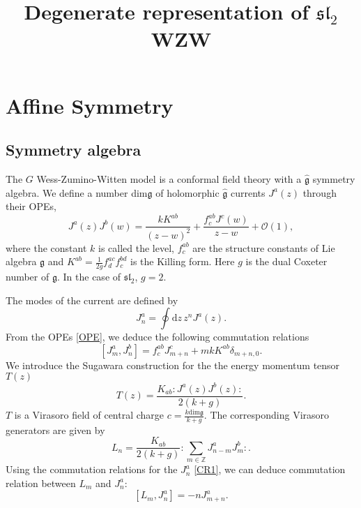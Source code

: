 \documentclass[10pt,a4paper]{article}
\numberwithin{equation}{section}
\begin{document}
\title{Degenerate representation of $\mathfrak{sl}_{2}$ WZW}
\maketitle

\tableofcontents

\section{Affine Symmetry}
\subsection{Symmetry algebra}
The $G$ Wess-Zumino-Witten model is a conformal field theory with a $\hat{\mathfrak{g}}$ symmetry algebra. We define a number dim$\mathfrak{g}$ of 
holomorphic $\hat{\mathfrak{g}}$ currents $J^{a}(z)$ through their OPEs,
\begin{equation}
    \boxed{
        J^{a}(z)J^{b}(w) = \frac{kK^{ab}}{(z-w)^{2}} + \frac{f^{ab}_{c} J^{c}(w)}{z-w} + \mathcal{O}(1), \label{OPE}
        }
\end{equation}
where the constant $k$ is called the level, $f^{ab}_{c}$ are the structure constants of Lie algebra $\mathfrak{g}$ and 
$K^{ab} = \frac{1}{2g} f^{ac}_{d}f^{bd}_{c}$ is the Killing form. Here $g$ is the dual Coxeter number of $\mathfrak{g}$. In the case of 
$\mathfrak{sl}_{2}$, $g = 2$.\\
\par The modes of the current are defined by 
\begin{equation}
    J^{a}_{n} = \oint \mathrm{d}z \, z^{n} J^{a}(z).
\end{equation}
From the OPEs \eqref{OPE}, we deduce the following commutation relations
\begin{equation}
    \left[ J^{a}_{m}, J^{b}_{n} \right] = f^{ab}_{c} J^{c}_{m+n} + m k K^{ab} \delta_{m+n,0}. \label{CR1}
\end{equation}
We introduce the Sugawara construction for the the energy momentum tensor $T(z)$
\begin{equation}
    \boxed{T(z) = \frac{K_{ab} : J^{a}(z) J^{b}(z) : }{2(k+g)}.} \label{EM}
\end{equation}
$T$ is a Virasoro field of central charge $c = \frac{k \mathrm{dim} \mathfrak{g}}{k+g}$. The corresponding Virasoro generators are given by
\begin{equation}
    L_{n} = \frac{K_{ab}}{2(k+g)} : \sum_{m \in \mathbb{Z} } J^{a}_{n-m} J^{b}_{m} :.
\end{equation}
Using the commutation relations for the $J^{a}_{n}$ \eqref{CR1}, we can deduce commutation relation between $L_{m}$ and $J^{a}_{n}$:
\begin{equation}
    \left[ L_{m}, J^{a}_{n} \right] = -n J^{a}_{m+n}. \label{CR2}
\end{equation}
\end{document}
